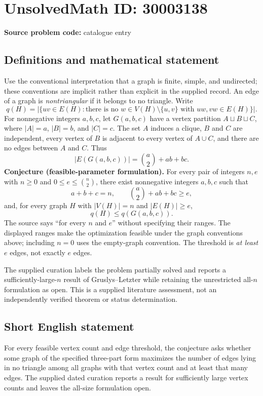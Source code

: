 \documentclass[11pt]{article}
\begin{document}
\section*{UnsolvedMath ID: 30003138}
\textbf{Source problem code:} catalogue entry
\subsection{Definitions and mathematical statement}
Use the conventional interpretation that a graph is finite, simple, and undirected; these conventions are implicit rather than explicit in the supplied record. An edge of a graph is \emph{nontriangular} if it belongs to no triangle. Write
\[
q(H)=\bigl|\{uv\in E(H):\text{there is no }w\in V(H)\setminus\{u,v\}\text{ with }uw,vw\in E(H)\}\bigr|.
\]
For nonnegative integers \(a,b,c\), let \(G(a,b,c)\) have a vertex partition \(A\sqcup B\sqcup C\), where \(|A|=a\), \(|B|=b\), and \(|C|=c\). The set \(A\) induces a clique, \(B\) and \(C\) are independent, every vertex of \(B\) is adjacent to every vertex of \(A\cup C\), and there are no edges between \(A\) and \(C\). Thus
\[
|E(G(a,b,c))|=\binom{a}{2}+ab+bc.
\]
\textbf{Conjecture (feasible-parameter formulation).} For every pair of integers \(n,e\) with \(n\geq 0\) and \(0\leq e\leq\binom{n}{2}\), there exist nonnegative integers \(a,b,c\) such that
\[
a+b+c=n,\qquad \binom{a}{2}+ab+bc\geq e,
\]
and, for every graph \(H\) with \(|V(H)|=n\) and \(|E(H)|\geq e\),
\[
q(H)\leq q(G(a,b,c)).
\]
The source says ``for every \(n\) and \(e\)'' without specifying their ranges. The displayed ranges make the optimization feasible under the graph conventions above; including \(n=0\) uses the empty-graph convention. The threshold is \emph{at least} \(e\) edges, not exactly \(e\) edges.

The supplied curation labels the problem partially solved and reports a sufficiently-large-\(n\) result of Gruslys--Letzter while retaining the unrestricted all-\(n\) formulation as open. This is a supplied literature assessment, not an independently verified theorem or status determination.
\subsection{Short English statement}
For every feasible vertex count and edge threshold, the conjecture asks whether some graph of the specified three-part form maximizes the number of edges lying in no triangle among all graphs with that vertex count and at least that many edges. The supplied dated curation reports a result for sufficiently large vertex counts and leaves the all-size formulation open.
\end{document}
